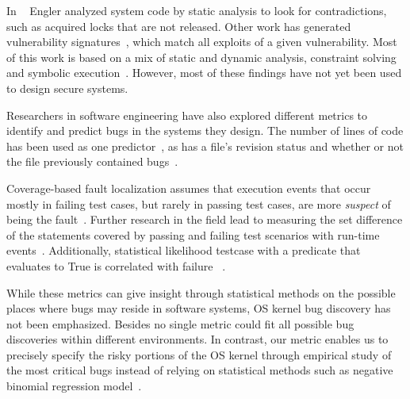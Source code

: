 In ~\cite{engler2001bugs} Engler analyzed system code by static analysis
to look for contradictions, such as acquired locks that are
not released. Other work has generated vulnerability
signatures~\cite{brumley2006towards}, which match all exploits
of a given vulnerability. Most of this work is based on a mix of static and
dynamic analysis, constraint solving and symbolic execution~\cite{chou2003static}.
However, most of these findings have not yet been used to design
secure systems.

Researchers in software engineering have also explored different metrics to identify and predict bugs in the systems they design.
The number of lines of code has been used as one predictor~\cite{Bug-Location}, as has a file's revision status and
whether or not the file previously contained bugs~\cite{Bug-Location, lewis2013does}.


Coverage-based fault localization assumes that execution events that occur mostly in failing
test cases, but rarely in passing test cases, are more \textit{suspect}
of being the fault~\cite{jones2002visualization}. Further research in the field lead to measuring the set
difference of the statements covered by passing and failing test scenarios with run-time events~\cite{agrawal1995fault, jones2005empirical}.
Additionally, statistical likelihood testcase with a predicate that evaluates to True
is correlated with failure ~\cite{liblit2005scalable}.



While these metrics can give insight through statistical methods on the possible places
where bugs may reside in software systems, OS kernel bug discovery has not been emphasized.
Besides no single metric could fit all possible bug discoveries within different environments.
In contrast, our metric enables us to precisely specify the risky portions of the OS kernel
through empirical study of the most critical bugs
instead of relying on statistical methods such as negative binomial regression model~\cite{Bug-Location}.

